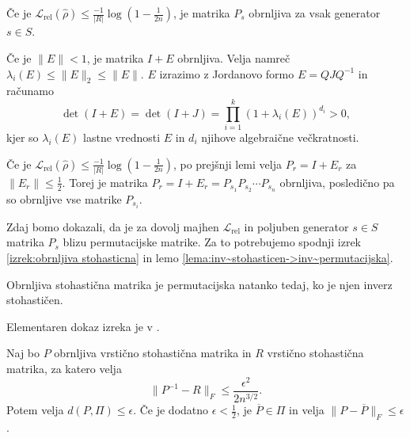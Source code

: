 \documentclass[mat2, tisk]{fmfdelo}
\newcommand{\Loss}[1]{\mathcal L _\text{#1}}
\begin{document}
\begin{lema}
  \label{lema : Ps je obrnljiva}
  Če je
  $\Loss{rel}(\hat\rho) \leq \frac{-1}{|R|}\log(1-\frac{1}{2n})$,
  je
  matrika $P_s$ obrnljiva za vsak
  generator $s \in S$.
\end{lema}
\begin{dokaz}

  Če je $\|E\| < 1$, je matrika $I + E$ obrnljiva.
  Velja namreč $\lambda_i(E) \leq \|E\|_2 \leq \|E\|$.
  $E$ izrazimo z Jordanovo formo
  $E = Q J Q^{-1}$ in računamo
  $$
  \operatorname{det}(I + E) = \operatorname{det}(I + J)
  = \prod_{i=1}^k (1 + \lambda_i(E))^{d_i}  > 0,
  $$
  kjer so $\lambda_i(E)$ lastne vrednosti $E$ in $d_i$
  njihove algebraične večkratnosti.

  Če je
  $\Loss{rel}(\hat\rho) \leq \frac{-1}{|R|}\log(1-\frac{1}{2n})$,
  po prejšnji lemi velja
  $P_r = I + E_r$ za $\|E_r\| \leq \frac{1}{2}$. Torej je
  matrika $P_r = I + E_r = P_{s_1}  P_{s_2} \dotsm  P_{s_n}$
  obrnljiva, posledično pa so obrnljive vse matrike $ P_{s_i}$.
\end{dokaz}
Zdaj bomo dokazali, da je za dovolj majhen $\Loss{rel}$
in poljuben generator $s \in S$ matrika $P_s$ blizu
permutacijske matrike.
Za to potrebujemo spodnji izrek \ref{izrek:obrnljiva
stohasticna} in lemo
\ref{lema:inv~stohasticen->inv~permutacijska}.
\begin{izrek}
  \label{izrek:obrnljiva stohasticna}
  Obrnljiva stohastična matrika je permutacijska
  natanko tedaj, ko je njen inverz stohastičen.
\end{izrek}
Elementaren dokaz izreka je v
\cite{Ding01032013stohasticmatrixinversestohasticcondition}.
\begin{lema}
  \label{lema:inv~stohasticen->inv~permutacijska}
  Naj bo $P$ obrnljiva vrstično stohastična matrika in
  $R$ vrstično stohastična matrika, za katero velja
  \[
    \|P^{-1}-R\|_F \le \frac{\epsilon^{2}}{2n^{3/2}} .
  \]
  Potem velja $d(P,\Pi)\le \epsilon$.
  Če je dodatno $\epsilon<\tfrac12$, je $\overline P\in\Pi$
  in velja
  $
  \|P-\overline P\|_F\le \epsilon
  $.
\end{lema}
\end{document}
